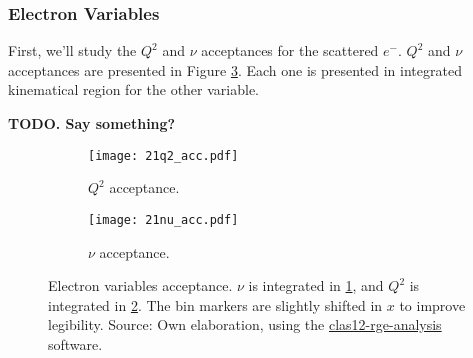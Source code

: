 \subsubsection{Electron Variables}
\label{14.21::electron_variables}
    First, we'll study the $Q^2$ and $\nu$ acceptances for the scattered $e^-$.
    $Q^2$ and $\nu$ acceptances are presented in Figure \ref{fig::14.21::electron_acc}.
    Each one is presented in integrated kinematical region for the other variable.

    \textbf{TODO. Say something?}



    \begin{figure}
        \centering
        \begin{subfigure}[b]{0.49\textwidth}
            \centering
            \texttt{[image: 21q2\_acc.pdf]}
            \caption{$Q^2$ acceptance.}
            \label{fig::14.21::q2_acc}
        \end{subfigure}
        \hfill
        \begin{subfigure}[b]{0.49\textwidth}
            \centering
            \texttt{[image: 21nu\_acc.pdf]}
            \caption{$\nu$ acceptance.}
            \label{fig::14.21::nu_acc}
        \end{subfigure}
        \caption[Electron variables acceptance.]{Electron variables acceptance.
        $\nu$ is integrated in \ref{fig::14.21::q2_acc}, and $Q^2$ is integrated in \ref{fig::14.21::nu_acc}.
        The bin markers are slightly shifted in $x$ to improve legibility.
        Source: Own elaboration, using the \href{https://github.com/bleaktwig/clas12-rge-analysis}{clas12-rge-analysis} software.}
        \label{fig::14.21::electron_acc}
    \end{figure}
